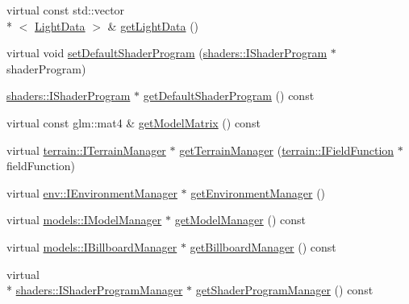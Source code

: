 \begin{DoxyCompactItemize}
\item 
virtual const std\-::vector\\*
$<$ \hyperlink{structglr_1_1LightData}{Light\-Data} $>$ \& \hyperlink{classglr_1_1BasicSceneManager_aca89dc417885e778d73db2dd997c5675}{get\-Light\-Data} ()
\item 
virtual void \hyperlink{classglr_1_1BasicSceneManager_ae21bd289bf567e74ec4fba1a7253e4c9}{set\-Default\-Shader\-Program} (\hyperlink{classglr_1_1shaders_1_1IShaderProgram}{shaders\-::\-I\-Shader\-Program} $\ast$shader\-Program)
\item 
\hyperlink{classglr_1_1shaders_1_1IShaderProgram}{shaders\-::\-I\-Shader\-Program} $\ast$ \hyperlink{classglr_1_1BasicSceneManager_ad564b17770fdc591b870a914b295b467}{get\-Default\-Shader\-Program} () const 
\item 
virtual const glm\-::mat4 \& \hyperlink{classglr_1_1BasicSceneManager_a11daa443df41653b5cc68605bc4c9fb0}{get\-Model\-Matrix} () const 
\item 
virtual \hyperlink{classglr_1_1terrain_1_1ITerrainManager}{terrain\-::\-I\-Terrain\-Manager} $\ast$ \hyperlink{classglr_1_1BasicSceneManager_a70c54e717af9b8a9c57a8083e5be68f2}{get\-Terrain\-Manager} (\hyperlink{classglr_1_1terrain_1_1IFieldFunction}{terrain\-::\-I\-Field\-Function} $\ast$field\-Function)
\item 
virtual \hyperlink{classglr_1_1env_1_1IEnvironmentManager}{env\-::\-I\-Environment\-Manager} $\ast$ \hyperlink{classglr_1_1BasicSceneManager_a0483479ad21c2ed0b8f9aa2a75516aa8}{get\-Environment\-Manager} ()
\item 
virtual \hyperlink{classglr_1_1models_1_1IModelManager}{models\-::\-I\-Model\-Manager} $\ast$ \hyperlink{classglr_1_1BasicSceneManager_a41db22f282569eb0ef74d8b2b7995af1}{get\-Model\-Manager} () const 
\item 
virtual \hyperlink{classglr_1_1models_1_1IBillboardManager}{models\-::\-I\-Billboard\-Manager} $\ast$ \hyperlink{classglr_1_1BasicSceneManager_a38612ef9deca8bdb77eb96d3cb853e48}{get\-Billboard\-Manager} () const 
\item 
virtual \\*
\hyperlink{classglr_1_1shaders_1_1IShaderProgramManager}{shaders\-::\-I\-Shader\-Program\-Manager} $\ast$ \hyperlink{classglr_1_1BasicSceneManager_a698b7a5e934876e7d666fea3243c4056}{get\-Shader\-Program\-Manager} () const 
\end{DoxyCompactItemize}
